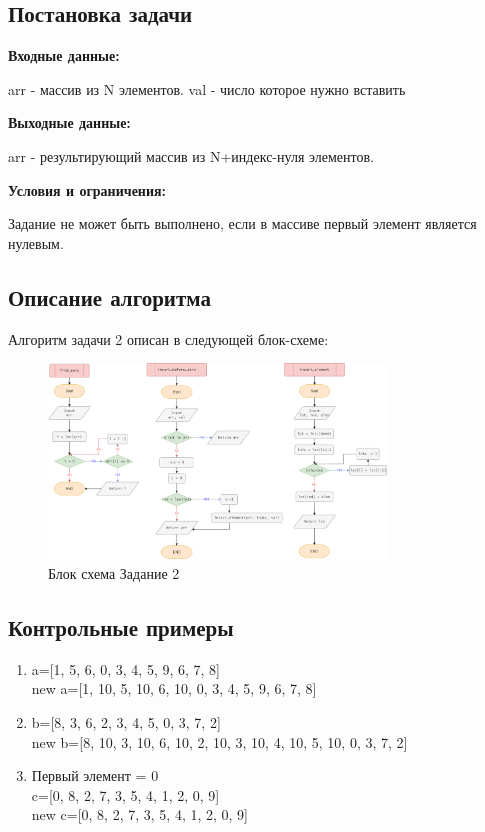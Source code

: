 \subsection{Постановка задачи}
\textbf{Входные данные:}

arr - массив из N элементов.
val - число которое нужно вставить

\textbf{Выходные данные:}

arr - результирующий массив из N+индекс-нуля элементов.

\textbf{Условия и ограничения:}

Задание не может быть выполнено, если в массиве первый элемент является нулевым.



\subsection{Описание алгоритма}

Алгоритм задачи 2 описан в следующей блок-схеме:

\begin{figure}[H]
    \centering
    \includegraphics[width=0.8\textwidth]{./flowcharts/second_task.drawio.png}
    \caption{Блок схема Задание 2}
\end{figure}


\subsection{Контрольные примеры}
\begin{enumerate}
    \item a=[1, 5, 6, 0, 3, 4, 5, 9, 6, 7, 8] \\ new a=[1, 10, 5, 10, 6, 10, 0, 3, 4, 5, 9, 6, 7, 8]                                                                        
    \item b=[8, 3, 6, 2, 3, 4, 5, 0, 3, 7, 2] \\ new b=[8, 10, 3, 10, 6, 10, 2, 10, 3, 10, 4, 10, 5, 10, 0, 3, 7, 2]
    \item Первый элемент = 0 \\ c=[0, 8, 2, 7, 3, 5, 4, 1, 2, 0, 9] \\ new c=[0, 8, 2, 7, 3, 5, 4, 1, 2, 0, 9]

\end{enumerate}


